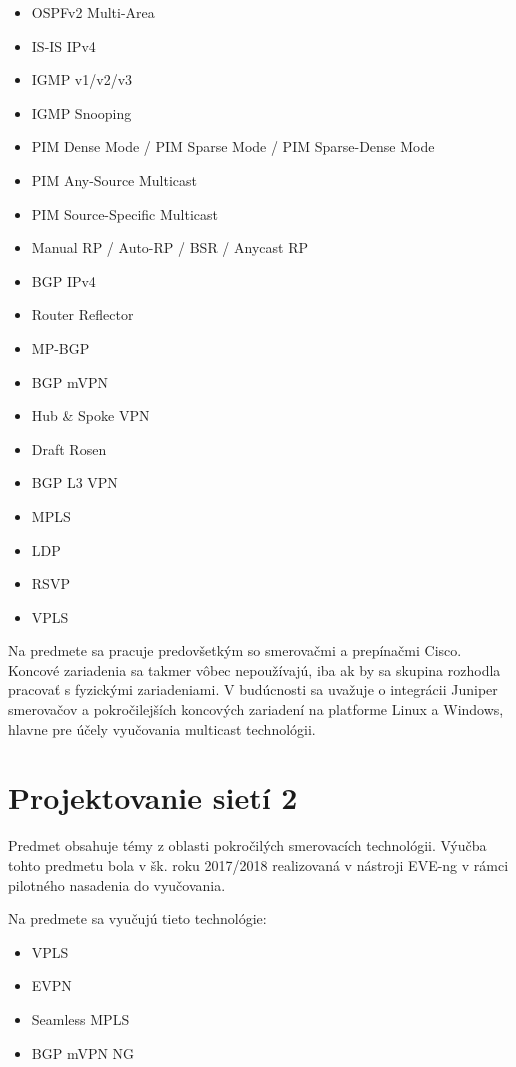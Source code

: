 \begin{itemize}[noitemsep]
    \item OSPFv2 Multi-Area
    \item IS-IS IPv4 
    \item IGMP v1/v2/v3
    \item IGMP Snooping
    \item PIM Dense Mode / PIM Sparse Mode / PIM Sparse-Dense Mode
    \item PIM Any-Source Multicast
    \item PIM Source-Specific Multicast
    \item Manual RP / Auto-RP / BSR / Anycast RP
    \item BGP IPv4
    \item Router Reflector
    \item MP-BGP
    \item BGP mVPN
    \item Hub \& Spoke VPN
    \item Draft Rosen
    \item BGP L3 VPN
    \item MPLS
    \item LDP
    \item RSVP
    \item VPLS
\end{itemize}

Na predmete sa pracuje predovšetkým so smerovačmi a prepínačmi Cisco. Koncové zariadenia sa takmer vôbec nepoužívajú, iba ak by sa skupina rozhodla pracovať s fyzickými zariadeniami. V budúcnosti sa uvažuje o integrácii Juniper smerovačov a pokročilejších koncových zariadení na platforme Linux a Windows, hlavne pre účely vyučovania multicast technológii.



\section{Projektovanie sietí 2}

Predmet obsahuje témy z oblasti pokročilých smerovacích technológii. Výučba tohto predmetu bola v šk. roku 2017/2018 realizovaná v nástroji EVE-ng v rámci pilotného nasadenia do vyučovania.

Na predmete sa vyučujú tieto technológie:

\begin{itemize}[noitemsep]
    \item VPLS
    \item EVPN
    \item Seamless MPLS
    \item BGP mVPN NG
\end{itemize}


